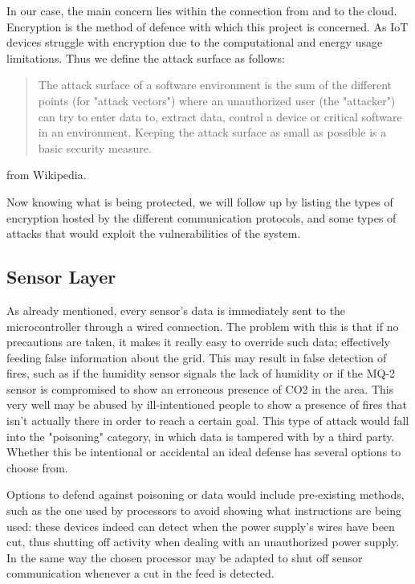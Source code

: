\documentclass[11pt]{article}
\begin{document}
In our case, the main concern lies within the connection from and to the cloud. Encryption is the method of defence with which this project is concerned. As IoT devices struggle with encryption due to the computational and energy usage limitations. Thus we define the attack surface as follows: \par 

\begin{quote}
    The attack surface of a software environment is the sum of the different points (for "attack vectors") where an unauthorized user (the "attacker") can try to enter data to, extract data, control a device or critical software in an environment. Keeping the attack surface as small as possible is a basic security measure.
\end{quote} from Wikipedia. \par \vspace{0.5 cm}

Now knowing what is being protected, we will follow up by listing the types of encryption hosted by the different communication protocols, and some types of attacks that would exploit the vulnerabilities of the system.

\newpage

\subsection{Sensor Layer}
As already mentioned, every sensor's data is immediately sent to the microcontroller through a wired connection. The problem with this is that if no precautions are taken, it makes it really easy to override such data; effectively feeding false information about the grid. This may result in false detection of fires, such as if the humidity sensor signals the lack of humidity or if the MQ-2 sensor is compromised to show an erroneous presence of CO2 in the area. This very well may be abused by ill-intentioned people to show a presence of fires that isn't actually there in order to reach a certain goal. This type of attack would fall into the "poisoning" category, in which data is tampered with by a third party. Whether this be intentional or accidental an ideal defense has several options to choose from.
\par \vspace{0.5 cm}

Options to defend against poisoning or data would include pre-existing methods, such as the one used by processors to avoid showing what instructions are being used: these devices indeed can detect when the power supply's wires have been cut, thus shutting off activity when dealing with an unauthorized power supply. In the same way the chosen processor may be adapted to shut off sensor communication whenever a cut in the feed is detected. \par \vspace{0.5 cm}
\end{document}
